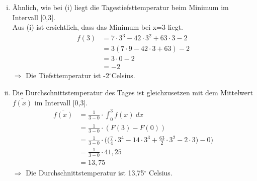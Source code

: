 \documentclass[a4paper]{scrartcl}
\begin{document}
\begin{enumerate}
\begin{enumerate}[(i)]
\item
Ähnlich, wie bei (i) liegt die Tagestiefsttemperatur beim Minimum im Intervall [0,3].\\
Aus (i) ist ersichtlich, dass das Minimum bei x=3 liegt.
\begin{align}
f(3) &= 7\cdot 3^3-42\cdot 3^2 + 63 \cdot 3 -2\\
	&= 3(7\cdot 9 - 42\cdot 3 +63) -2\\
	&= 3 \cdot 0 -2\\
	&= -2
\end{align}
\(\Rightarrow\) Die Tiefsttemperatur ist -2\(^\circ \)Celsius.\\
\item
Die Durchschnittstemperatur des Tages ist gleichzusetzen mit dem Mittelwert \(\overline{f(x)}\) im Intervall [0,3].\\
\begin{align}
\overline{f(x)}&= \frac{1}{3-0} \cdot \int_0^3 f(x)\ dx\\
	&= \frac{1}{3-0} \cdot (F(3)-F(0))\\
	&= \frac{1}{3-0} \cdot \bigg( \Big( \frac{7}{4}\cdot 3^4 -14\cdot 3^3 +\frac{63}{2} \cdot 3^2 -2\cdot 3 \Big) -0 \bigg)\\
	&= \frac{1}{3-0} \cdot 41,25\\
	&= 13,75	
\end{align}
\(\Rightarrow \) Die Durchschnittstemperatur ist 13,75\(^\circ\) Celsius.
\end{enumerate}

\end{enumerate}
\end{document}
